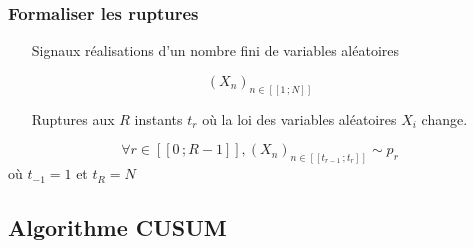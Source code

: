 \documentclass{beamer}
\begin{document}
\begin{frame}

\frametitle{Formaliser les ruptures}

\begin{itemize}
	\item[Signaux] réalisations d'un nombre fini de variables aléatoires
\end{itemize}

\vspace{-.4cm}
\[ (X_n)_{n \in [\![ 1\,; N ]\!] } \]
\phantom{kcahkcah}
	
\begin{itemize}
	\item[Ruptures]aux $R$ instants $t_r$ où la loi des variables aléatoires $X_i$ change.
\end{itemize}

\vspace{-.4cm}
\[ \forall r \in [\![0\,;R-1]\!] , (X_n)_{n\in[\![t_{r-1}\,;t_r]\!]} \sim p_r\]
\hspace{.7cm}
où $t_{-1}=1$ et $t_R=N$


\end{frame}

\subsection{Algorithme CUSUM}
\end{document}
